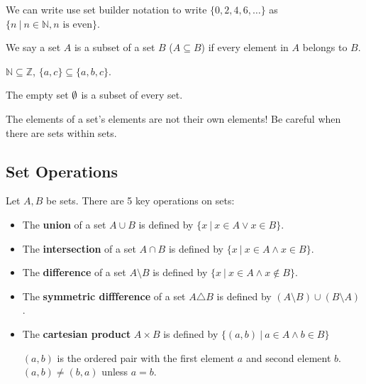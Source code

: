 \documentclass[a4paper]{article}
\begin{document}
\begin{notation}
	We can write use set builder notation to write \( \{0, 2, 4, 6, \ldots \}   \) as \( \{n ~|~ n \in \mathbb{N}, n \text{ is even}\} \).
\end{notation}

\begin{definition}
	We say a set \( A \) is a subset of a set \( B \) (\( A \subseteq B\)) if every element in \( A \) belongs to \( B \).
\end{definition}

\begin{eg}
	\( \mathbb{N} \subseteq \mathbb{Z} \), \( \{a, c\} \subseteq \{a, b, c\}    \).
\end{eg}

\begin{property}
	The empty set \( \emptyset \) is a subset of every set.
\end{property}

\begin{note}
	The elements of a set's elements are not their own elements! Be careful when there are sets within sets.
\end{note}

\subsection{Set Operations}
Let \( A,B \) be sets. There are 5 key operations on sets:
\begin{itemize}
	\item The \textbf{union} of a set \( A \cup B \) is defined by \( \{x ~|~ x \in A \lor x \in B\}   \).
	\item The \textbf{intersection} of a set \( A \cap B \) is defined by \( \{x ~|~ x \in A \land x \in B \}   \).
	\item The \textbf{difference} of a set \( A \setminus B \) is defined by \( \{x ~|~ x \in A \land x \not\in B \}   \).
	\item The \textbf{symmetric diffference} of a set \( A \triangle B \) is defined by \( (A \setminus B) \cup (B \setminus A) \).
	\item The \textbf{cartesian product} \( A \times B \) is defined by \( \{(a,b) ~|~ a \in A \land b \in B\}  \)
		\begin{note}
			\( (a,b) \) is the ordered pair with the first element \( a \) and second element \( b \). \( (a,b) \neq  (b,a) \) unless \( a = b \).
		\end{note}
\end{itemize}
\end{document}
